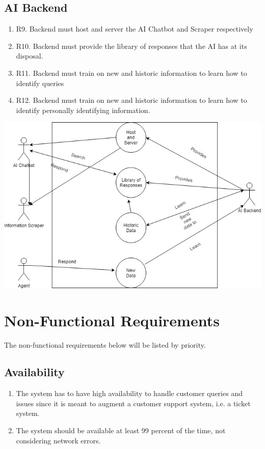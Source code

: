 \documentclass[11pt]{article}
\begin{document}
\subsection{AI Backend}
\begin{enumerate}
    \item R9. Backend must host and server the AI Chatbot and Scraper respectively
    \item R10. Backend must provide the library of responses that the AI has at its disposal.
    \item R11. Backend must train on new and historic information to learn how to identify queries
    \item R12. Backend must train on new and historic information to learn how to identify personally identifying information.
\end{enumerate}
\includegraphics[width=1.0\textwidth]{../../images/AI_Backend_UCD.jpg}
\section{Non-Functional Requirements}
The non-functional requirements below will be listed by priority.
\subsection{Availability}
\begin{enumerate}
    \item The system has to have high availability to handle customer queries and issues since it is meant to augment a customer support system, i.e. a ticket system.
    \item The system should be available at least 99 percent of the time, not considering network errors.
\end{enumerate}
\end{document}
